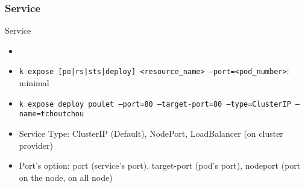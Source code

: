
\subsubsection{Service}
\begin{frame}[fragile]{Service}
  \begin{itemize}
    \item
    \item \texttt{k expose [po|rs|sts|deploy] <resource\_name> --port=<pod\_number>}: minimal
    \item \texttt{k expose deploy poulet --port=80 --target-port=80 --type=ClusterIP --name=tchoutchou}
  \end{itemize}
  \begin{itemize}
    \item Service Type: ClusterIP (Default), NodePort, LoadBalancer (on cluster provider)
    \item Port's option: port (service's port), target-port (pod's port), nodeport (port on the node, on all node)
  \end{itemize}
  \begin{lstlisting}
  \end{lstlisting}
\end{frame}
